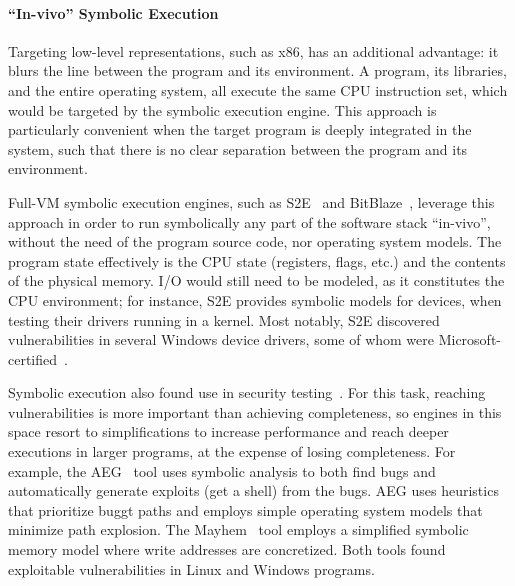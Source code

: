 \paragraph{``In-vivo'' Symbolic Execution}

Targeting low-level representations, such as x86, has an additional advantage: it blurs the line between the program and its environment.  A program, its libraries, and the entire operating system, all execute the same CPU instruction set, which would be targeted by the symbolic execution engine.
%
This approach is particularly convenient when the target program is deeply integrated in the system, such that there is no clear separation between the program and its environment.

Full-VM symbolic execution engines, such as S2E~\cite{s2eSystem} and BitBlaze~\cite{bitBlaze}, leverage this approach in order to run symbolically any part of the software stack ``in-vivo'', without the need of the program source code, nor operating system models.
%
The program state effectively is the CPU state (registers, flags, etc.) and the contents of the physical memory.
%
I/O would still need to be modeled, as it constitutes the CPU environment; for instance, S2E provides symbolic models for devices, when testing their drivers running in a kernel.
%
Most notably, S2E discovered vulnerabilities in several Windows device drivers, some of whom were Microsoft-certified~\cite{ddt}.

Symbolic execution also found use in security testing~\cite{aeg,mayhem,bitBlaze}.  For this task, reaching vulnerabilities is more important than achieving completeness, so engines in this space resort to simplifications to increase performance and reach deeper executions in larger programs, at the expense of losing completeness.
%
For example, the AEG~\cite{aeg} tool uses symbolic analysis to both find bugs and automatically generate exploits (get a shell) from the bugs.  AEG uses heuristics that prioritize buggt paths and employs simple operating system models that minimize path explosion.
%
The Mayhem~\cite{mayhem} tool employs a simplified symbolic memory model where write addresses are concretized.
%
Both tools found exploitable vulnerabilities in Linux and Windows programs.




